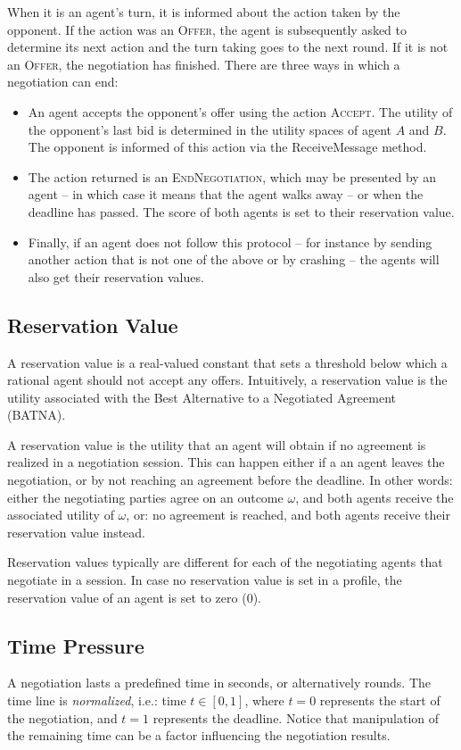 \documentclass[]{article}
\begin{document}
When it is an agent's turn, it is informed about the action taken by the opponent. If the action was an \textsc{Offer}, the agent is subsequently asked to determine its next action and the turn taking goes to the next round. If it is not an \textsc{Offer}, the negotiation has finished. There are three ways in which a negotiation can end:
\begin{itemize}
	\item An agent accepts the opponent's offer using the action \textsc{Accept}. The utility of the opponent's last bid is determined in the utility spaces of agent $A$ and $B$. The opponent is informed of this action via the ReceiveMessage method.
	\item The action returned is an \textsc{EndNegotiation}, which may be presented by an agent -- in which case it means that the agent walks away -- or when the deadline has passed. The score of both agents is set to their reservation value.
	\item Finally, if an agent does not follow this protocol -- for instance by sending another action that is not one of the above or by crashing -- the agents will also get their reservation values.
\end{itemize}


 
\subsection{Reservation Value}
A reservation value is a real-valued constant that sets a threshold below which a rational agent should not accept any offers. Intuitively, a reservation value is the utility associated with the Best Alternative to a Negotiated Agreement (BATNA).

A reservation value is the utility that an agent will obtain if no agreement is realized in a negotiation session. This can happen either if a an agent leaves the negotiation, or by not reaching an agreement before the deadline. In other words: either the negotiating parties agree on an outcome $\omega$, and both agents receive the associated utility of $\omega$, or: no agreement is reached, and both agents receive their reservation value instead.

Reservation values typically are different for each of the negotiating agents that negotiate in a session. In case no reservation value is set in a profile, the reservation value of an agent is set to zero (0).


\subsection{Time Pressure}
A negotiation lasts a predefined time in seconds, or alternatively rounds. The time line is \emph{normalized}, i.e.: time $t \in [0, 1]$, where $t = 0$ represents the start of the negotiation, and $t = 1$ represents the deadline. Notice that manipulation of the remaining time can be a factor influencing the negotiation results.
\end{document}
